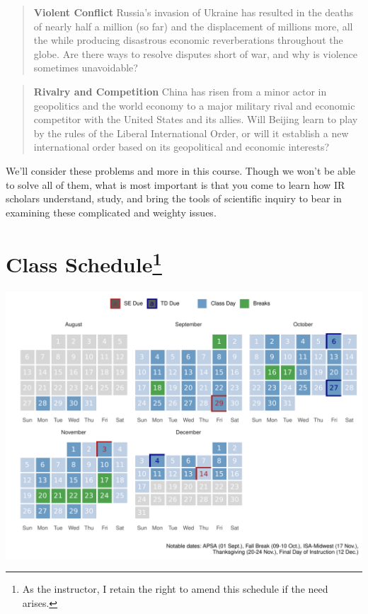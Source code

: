 \documentclass[11pt,]{article}
\makeatletter
\def\maxwidth{\ifdim\Gin@nat@width>\linewidth\linewidth
\else\Gin@nat@width\fi}
\let\Oldincludegraphics\includegraphics
\renewcommand{\includegraphics}[1]{\Oldincludegraphics[width=\maxwidth]{#1}}
\makeatother
\begin{document}
\begin{quote}
\textbf{Violent Conflict} \space \space Russia's invasion of Ukraine has
resulted in the deaths of nearly half a million (so far) and the
displacement of millions more, all the while producing disastrous
economic reverberations throughout the globe. Are there ways to resolve
disputes short of war, and why is violence sometimes unavoidable?
\end{quote}

\begin{quote}
\textbf{Rivalry and Competition} \space \space China has risen from a
minor actor in geopolitics and the world economy to a major military
rival and economic competitor with the United States and its allies.
Will Beijing learn to play by the rules of the Liberal International
Order, or will it establish a new international order based on its
geopolitical and economic interests?
\end{quote}

We'll consider these problems and more in this course. Though we won't
be able to solve all of them, what is most important is that you come to
learn how IR scholars understand, study, and bring the tools of
scientific inquiry to bear in examining these complicated and weighty
issues.

\newpage

\hypertarget{class-schedule}{%
\section[Class Schedule]{\texorpdfstring{Class
Schedule\footnote{As the instructor, I retain the right to amend this
  schedule if the need arises.}}{Class Schedule}}\label{class-schedule}}

\hrulefill

\includegraphics{figs/calendar.pdf}
\end{document}
